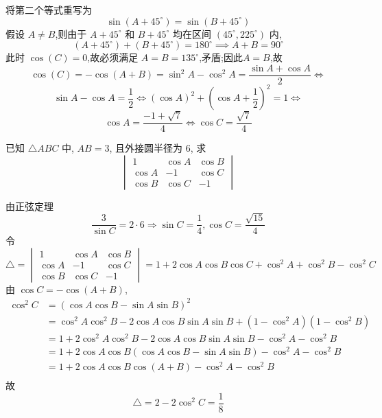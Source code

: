 \begin{questions}
\begin{solution}
        将第二个等式重写为
        \[
        \sin(A+45^{\circ}) = \sin(B+45^{\circ})
        \]
        假设 $A \neq B$,则由于 $A+45^{\circ}$ 和 $B+45^{\circ}$ 均在区间 $(45^{\circ}, 225^{\circ})$ 内, 
        \[
        (A+45^{\circ}) + (B+45^{\circ}) = 180^{\circ} \implies A+B = 90^{\circ}
        \]
        此时 $\cos(C) = 0$,故必须满足 $A=B=135^{\circ}$,矛盾;因此$A=B$,故
        \[
        \cos(C) = -\cos(A+B) = \sin^2 A - \cos^2 A = \frac{\sin A + \cos A}{2}
        \iff 
        \]
        \[
        \sin A - \cos A = \frac{1}{2} \iff (\cos A)^2 + \left(\cos A + \frac{1}{2}\right)^2 = 1
        \iff
        \]
        \[
        \cos A = \frac{-1 + \sqrt{7}}{4} \iff \cos C = \frac{\sqrt{7}}{4}
        \]
    \end{solution}
    \question 已知 $\triangle ABC$ 中, $AB=3$, 且外接圆半径为 $6$, 求
        \[
        \begin{vmatrix} 
        1 & \cos A & \cos B \\ 
        \cos A & -1 & \cos C \\ 
        \cos B & \cos C & -1 
        \end{vmatrix}
        \]
    \begin{solution}
        由正弦定理
        \[
        \frac{3}{\sin C} = 2 \cdot 6 \Rightarrow \sin C = \frac{1}{4}, \cos C = \frac{\sqrt{15}}{4}
        \]
        令
        \[
        \triangle = 
        \begin{vmatrix} 
        1 & \cos A & \cos B\\ 
        \cos A & -1 & \cos C\\ 
        \cos B & \cos C & -1
        \end{vmatrix} 
        = 1 + 2\cos A \cos B \cos C + \cos^2 A + \cos^2 B - \cos^2 C
        \]
        由 $ \cos C = -\cos(A+B)$,
        \begin{align*}
        \cos^2 C &= (\cos A \cos B - \sin A \sin B)^2 \\
        &= \cos^2 A \cos^2 B - 2 \cos A \cos B \sin A \sin B + (1-\cos^2 A)(1-\cos^2 B) \\
        &= 1 + 2 \cos^2 A \cos^2 B - 2 \cos A \cos B \sin A \sin B - \cos^2 A - \cos^2 B \\
        &= 1 + 2 \cos A \cos B (\cos A \cos B - \sin A \sin B) - \cos^2 A - \cos^2 B \\
        &= 1 + 2 \cos A \cos B \cos(A+B) - \cos^2 A - \cos^2 B\\
        \end{align*}
        故
        \[
        \triangle = 2 - 2 \cos^2 C= \frac{1}{8}
        \]
    \end{solution}


\end{questions}
